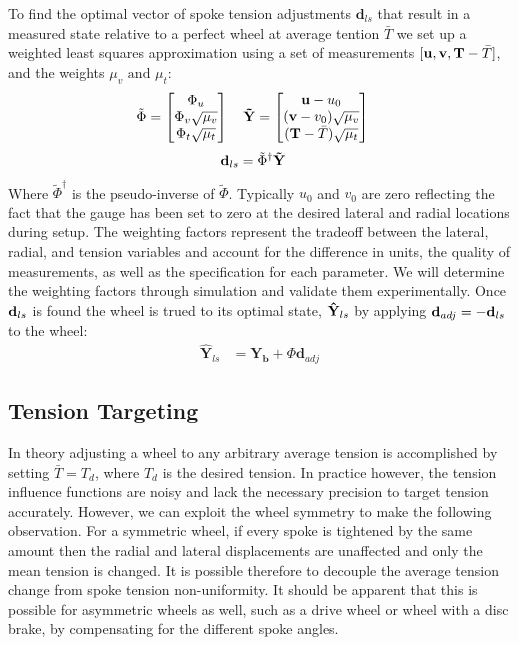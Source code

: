 \documentclass[journal]{IEEEtran}
\begin{document}
To find the optimal vector of spoke tension adjustments $\mathbf{d}_{ls}$ that result in a measured state relative to a perfect wheel at average tention $\bar T$ we set up a weighted least squares approximation using a set of measurements $ [ {\bf u,v,T}-\bar T ]$, and the weights $\mu_v \text{ and }\mu_t$:
\begin{align*}
    \tilde \Phi &= \begin{bmatrix}
    \Phi_u\\
    \Phi_v \sqrt {\mu_v}\\
    \Phi_t \sqrt {\mu_t}
    \end{bmatrix} \quad
    \bf \tilde Y = \begin{bmatrix}
    \mathbf {u} - u_0 \\
   (\mathbf {v}- v_0)  \sqrt {\mu_v}\\
    ( {\bf  T} - \bar T )  \sqrt {\mu_t}
    \end{bmatrix} 
\end{align*}
\begin{align}
        {\bf d}_{ls} &= \tilde \Phi^\dagger {\bf \tilde Y}
        \label{eq:dls}
\end{align}
Where $\tilde \Phi^\dagger$ is the pseudo-inverse of $\tilde \Phi$.  Typically $u_0$ and $v_0$ are zero reflecting the fact that the gauge has been set to zero at the desired lateral and radial locations during setup. The weighting factors represent the tradeoff between the lateral, radial, and tension variables and account for the difference in units, the quality of measurements, as well as the specification for each parameter. We will determine the weighting factors through simulation and validate them experimentally. Once ${\bf d}_{ls}$ is found the wheel is trued to its optimal state, ${\bf \hat Y}_{ls}$ by applying $\mathbf{d}_{adj} = -{\bf d}_{ls}$ to the wheel:
\begin{align}
\mathbf{\hat Y}_{ls} &= \mathbf{Y_b} + \Phi  \mathbf{d} _{adj}
\label{eq:Yls}
\end{align}

\subsection{Tension Targeting}
In theory adjusting a wheel to any arbitrary average tension is accomplished by setting $\bar T = T_d$, where $T_d$ is the desired tension.  In practice however, the tension influence functions are noisy and lack the necessary precision to target tension accurately.  However, we can exploit the wheel symmetry to make the following observation.  For a symmetric wheel, if every spoke is tightened by the same amount then the radial and lateral displacements are unaffected and only the mean tension is changed. It is possible therefore to decouple the average tension change from spoke tension non-uniformity. It should be apparent that this is possible for asymmetric wheels as well, such as a drive wheel or wheel with a disc brake, by compensating for the different spoke angles. 
\end{document}
